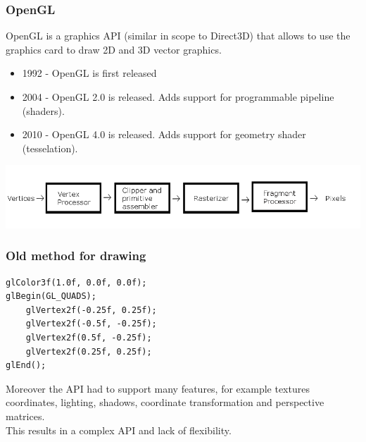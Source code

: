\begin{frame}

\frametitle{OpenGL}

OpenGL is a graphics API (similar in scope to Direct3D) that allows to use the
graphics card to draw 2D and 3D vector graphics.

\begin{itemize}
    \item{1992 - OpenGL is first released}
    \item{2004 - OpenGL 2.0 is released. Adds support for programmable pipeline (shaders).}
    \item{2010 - OpenGL 4.0 is released. Adds support for geometry shader (tesselation).}
\end{itemize}

\begin{center}
    \includegraphics[width=\textwidth]{images/pipeline.png}
\end{center}

\end{frame}


\begin{frame}[fragile]

\frametitle{Old method for drawing}

\begin{center}
\begin{lstlisting}
glColor3f(1.0f, 0.0f, 0.0f);
glBegin(GL_QUADS);
    glVertex2f(-0.25f, 0.25f);
    glVertex2f(-0.5f, -0.25f);
    glVertex2f(0.5f, -0.25f);
    glVertex2f(0.25f, 0.25f);
glEnd();
\end{lstlisting}
\end{center}

Moreover the API had to support many features, for example textures coordinates,
lighting, shadows, coordinate transformation and perspective matrices.
\newline
\\
This results in a complex API and lack of flexibility.

\end{frame}


